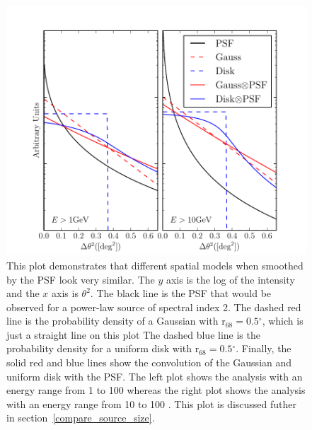 \documentclass[12pt,preprint]{aastex}
\newcommand{\gev}{\text{GeV}\xspace}
\newcommand{\rsixeight}{{\ensuremath{\text{r}_{68}}}\xspace}
\renewcommand{\deg}{\ensuremath{^\circ}\xspace}
\begin{document}
\begin{figure}
  \begin{center}
    \includegraphics{mc_plots/compare_disk_gauss.pdf}
    \end{center}
    \caption{
    This plot demonstrates that different spatial models when smoothed
    by the PSF look very similar.  The $y$ axis is the log of the
    intensity and the $x$ axis is $\theta^2$.  The black line is the
    PSF that would be observed for a power-law source of spectral index
    2. The dashed red line is the probability density of a Gaussian with
    $\rsixeight=0.5\deg$, which is just a straight line on this plot
    The dashed blue line is the probability density for a uniform disk
    with $\rsixeight=0.5\deg$.  Finally, the solid red and blue lines
    show the convolution of the Gaussian and uniform disk with the PSF.
    The left plot shows the analysis with an energy range from 1 \gev to
    100 \gev whereas the right plot shows the analysis with an energy
    range from 10 \gev to 100 \gev.  This plot is discussed futher in
    section~\ref{compare_source_size}.
    }\label{compare_disk_gauss}
  \end{figure}
\end{document}
